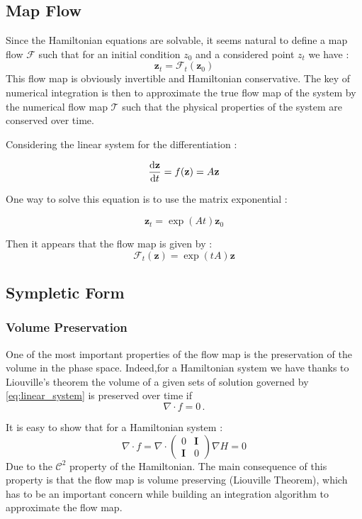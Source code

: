 \documentclass[ansiapaper]{report}
\begin{document}
\begin{multicols}{3}
	\subsection{Map Flow}

	Since the Hamiltonian equations are solvable, it seems natural to define a map flow $\mathcal{F}$ such that for an initial condition $z_0$ and a considered point $z_t$ we have :
	$$\textbf{z} _t = \mathcal{F}_t(\textbf{z}_0)$$
	This flow map is obviously invertible and Hamiltonian conservative. The key of numerical integration is then to approximate the true flow map of the system by the numerical flow map $\mathcal{T}$ such that the physical properties of the system are conserved over time.

	Considering the linear system for the differentiation :

	\begin{equation}
		\label{eq:linear_system}
		\dv{\textbf{z}}{t} = f(\textbf{z} ) = A\textbf{z}
	\end{equation}

	One way to solve this equation is to use the matrix exponential :

	$$\textbf{z}_t = \exp(At)\textbf{z}_0$$

	Then it appears that the flow map is given by :
	\begin{equation}
		\label{eq:flow_map}
		\mathcal{F}_t(\textbf{z} ) = \exp(tA)\textbf{z}
	\end{equation}

	\subsection{Sympletic Form}

	\subsubsection{Volume Preservation}
	One of the most important properties of the flow map is the preservation of the volume in the phase space. Indeed,for a Hamiltonian system we have thanks to Liouville's theorem the volume of a given sets of solution governed by \ref{eq:linear_system} is preserved over time if $$ \nabla \cdot f = 0 \, .$$

	It is easy to show that for a Hamiltonian system : $$\nabla \cdot f = \nabla \cdot \begin{pmatrix}
			0          & \textbf{I} \\
			\textbf{I} & 0
		\end{pmatrix} \nabla H = 0$$
	Due to the $\mathcal{C}^2$ property of the Hamiltonian. The main consequence of this property is that the flow map is volume preserving (Liouville Theorem), which has to be an important concern while building an integration algorithm to approximate the flow map.


\end{multicols}
\end{document}
